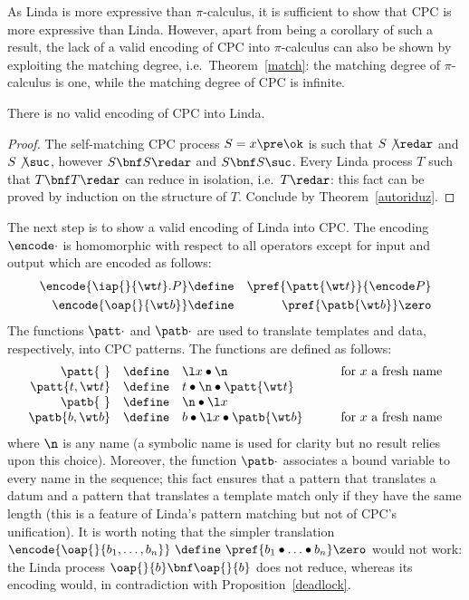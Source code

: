 \documentclass{LMCS}
\begin{document}
As Linda is more expressive than $\pi$-calculus, it is sufficient to show that CPC is more expressive than Linda.
However, apart from being a corollary of such a result, the lack of a valid encoding of CPC into $\pi$-calculus can also be shown by exploiting the matching degree, i.e.\ Theorem~\ref{match}: the matching degree of $\pi$-calculus is one, while the matching degree of CPC is infinite.

\begin{thm}
\label{noCPCinLinda-1}
There is no valid encoding of CPC into Linda.
\end{thm}
\begin{proof}
The self-matching CPC process $S=x \pre \ok$ is such that $S\not\redar$ and $S\not\suc$, however $S\bnf S\redar$ and $S\bnf S\suc$. Every Linda process $T$ such that $T\bnf T\redar$ can reduce in isolation, i.e.\ $T\redar$: this fact can be proved by induction on the structure of $T$. Conclude by Theorem~\ref{autoriduz}.
\end{proof}

The next step is to show a valid encoding of Linda into CPC.
The encoding $\encode\cdot$ is homomorphic with
respect to all operators except for input and output which are encoded as follows:
\begin{eqnarray*}
\encode{\iap{}{\wt t}.P} &\define& \pref {\patt{\wt t}} {\encode P}\\
\encode{\oap{}{\wt b}} &\define&  \pref {\patb{\wt b}} \zero
\end{eqnarray*}
The functions $\patt\cdot$ and $\patb\cdot$ are used to translate templates and data, respectively, 
into CPC patterns. The functions are defined as follows:
$$
\begin{array}{rcll}
\patt{\ } & \define & \l x \bullet \n
& \mbox{for $x$ a fresh name} 
\\
\patt{t,\wt t} & \define & t \bullet \n \bullet \patt{\wt t}
\\
\patb{\ } & \define & \n \bullet \l x
\\
\patb{b,\wt b} & \define & b \bullet \l x \bullet \patb{\wt b}
\qquad & \mbox{for $x$ a fresh name} 
\end{array}
$$
where $\n$ is any name (a symbolic name is used for clarity but no result relies upon this choice).
Moreover, the function $\patb\cdot$ associates a bound variable to 
every name in the sequence; this fact ensures that 
a pattern that translates a datum and a pattern that translates 
a template match only if they have the same length (this is a feature
of Linda's pattern matching but not of CPC's unification).
It is worth noting that the simpler translation
$
\encode{\oap{}{b_1,\ldots,b_n}} \ \define\ 
\pref {b_1 \bullet \ldots \bullet b_n} \zero
$
would not work: the Linda process $\oap{}{b}\bnf\oap{}{b}$
does not reduce, whereas its encoding would, in contradiction with Proposition~\ref{deadlock}.
\end{document}
